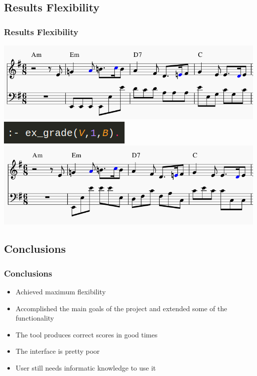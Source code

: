 \documentclass[english]{beamer}
\begin{document}
\subsection{Results Flexibility}
\begin{frame}
	\frametitle{Results Flexibility}
	\begin{center}
		\includegraphics[width=0.8\linewidth]{imagenes/no_cello_plain.png}
		\vfill
		\includegraphics[width=0.4\linewidth]{imagenes/no_grade_one_rule.png}
		\vfill
		\includegraphics[width=0.8\linewidth]{imagenes/no_first_grade.png}
	\end{center}
\end{frame}

\subsection{Conclusions}
		\begin{frame}
			\frametitle{Conclusions}
			\begin{itemize}
				\item<pro@1-> Achieved maximum flexibility
			      \item<pro@1-> Accomplished the main goals of the project and extended some of the functionality
			      \item<pro@1-> The tool produces correct scores in good times
			      \item<con@1-> The interface is pretty poor
			      \item<con@1-> User still needs informatic knowledge to use it
			    \end{itemize}
		\end{frame}
\end{document}
